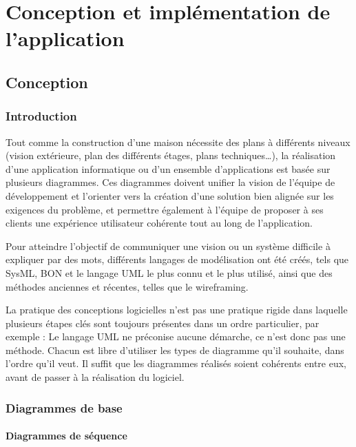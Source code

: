 \chapter{Conception et implémentation de l’application}

\section{Conception}

\subsection{Introduction}
Tout comme la construction d’une maison nécessite des plans à différents niveaux (vision extérieure, plan des différents étages, plans techniques…), la réalisation d’une application informatique ou d’un ensemble d’applications est basée sur plusieurs diagrammes. Ces diagrammes doivent unifier la vision de l’équipe de développement et l’orienter vers la création d’une solution bien alignée sur les exigences du problème, et permettre également à l’équipe de proposer à ses clients une expérience utilisateur cohérente tout au long de l’application. 

Pour atteindre l'objectif de communiquer une vision ou un système difficile à expliquer par des mots, différents langages de modélisation ont été créés, tels que SysML, BON et le langage \acrshort{UML} le plus connu et le plus utilisé, ainsi que des méthodes anciennes et récentes, telles que le wireframing.

La pratique des conceptions logicielles n’est pas une pratique rigide dans laquelle plusieurs étapes clés sont toujours présentes dans un ordre particulier, par exemple : Le langage UML ne préconise aucune démarche, ce n’est donc pas une méthode. Chacun est libre d’utiliser les types de diagramme qu’il souhaite, dans l’ordre qu’il veut. Il suffit que les diagrammes réalisés soient cohérents entre eux, avant de passer à la réalisation du logiciel.

\subsection{Diagrammes de base}
\subsubsection{Diagrammes de séquence}

